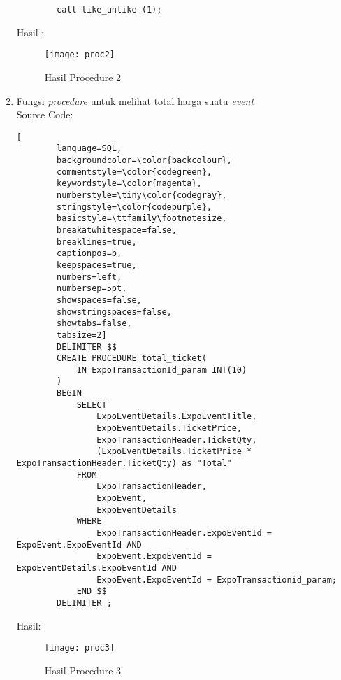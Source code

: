 \begin{enumerate}
\begin{lstlisting}
		call like_unlike (1);
	\end{lstlisting}
	Hasil : 
	\\
	\begin{figure}[H]
		\centering
		\texttt{[image: proc2]}
		\caption{Hasil Procedure 2}
	\end{figure}
	
	\item 	Fungsi \textit{procedure} untuk melihat total harga suatu \textit{event} \\
	Source Code:
	\begin{lstlisting}[
		language=SQL,
		backgroundcolor=\color{backcolour},   
		commentstyle=\color{codegreen},
		keywordstyle=\color{magenta},
		numberstyle=\tiny\color{codegray},
		stringstyle=\color{codepurple},
		basicstyle=\ttfamily\footnotesize,
		breakatwhitespace=false,         
		breaklines=true,                 
		captionpos=b,                    
		keepspaces=true,                 
		numbers=left,                    
		numbersep=5pt,                  
		showspaces=false,                
		showstringspaces=false,
		showtabs=false,                  
		tabsize=2]
		DELIMITER $$
		CREATE PROCEDURE total_ticket(
			IN ExpoTransactionId_param INT(10)
		)
		BEGIN
			SELECT
				ExpoEventDetails.ExpoEventTitle,
				ExpoEventDetails.TicketPrice,
				ExpoTransactionHeader.TicketQty,
				(ExpoEventDetails.TicketPrice * ExpoTransactionHeader.TicketQty) as "Total"
			FROM 
				ExpoTransactionHeader,
				ExpoEvent,
				ExpoEventDetails
			WHERE
				ExpoTransactionHeader.ExpoEventId = ExpoEvent.ExpoEventId AND
				ExpoEvent.ExpoEventId = ExpoEventDetails.ExpoEventId AND
				ExpoEvent.ExpoEventId = ExpoTransactionid_param;
			END $$
		DELIMITER ;
	\end{lstlisting}
	Hasil:
	\\
	\begin{figure}[H]
		\centering
		\texttt{[image: proc3]}
		\caption{Hasil Procedure 3}
	\end{figure}
\end{enumerate}